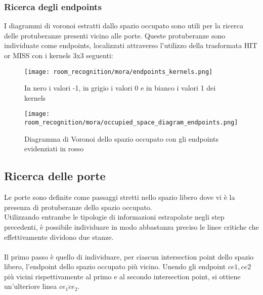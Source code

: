 \subsubsection{Ricerca degli endpoints}
I diagrammi di voronoi estratti dallo spazio occupato sono utili per la ricerca delle protuberanze presenti vicino alle porte. Queste protuberanze sono individuate come endpoints, localizzati attraverso l'utilizzo della trasformata HIT or MISS con i kernels 3x3 seguenti:
\begin{figure}[H]
  \centering
  \texttt{[image: room\_recognition/mora/endpoints\_kernels.png]}
  \caption{In nero i valori -1, in grigio i valori 0 e in bianco i valori 1 dei kernels}
\end{figure}
\begin{figure}[H]
  \centering
  \texttt{[image: room\_recognition/mora/occupied\_space\_diagram\_endpoints.png]}
  \caption{Diagramma di Voronoi dello spazio occupato con gli endpoints evidenziati in rosso}
\end{figure}
\subsection{Ricerca delle porte}
Le porte sono definite come passaggi stretti nello spazio libero dove vi è la presenza di protuberanze dello spazio occupato.\\
Utilizzando entrambe le tipologie di informazioni estrapolate negli step precedenti, è possibile individuare in modo abbastanza preciso le linee critiche che effettivamente dividono due stanze. \\\\
Il primo passo è quello di individuare, per ciascun intersection point dello spazio libero, l'endpoint dello spazio occupato più vicino. Unendo gli endpoint $ce1, ce2$ più vicini rispettivamente al primo e al secondo intersection point, si ottiene un'ulteriore linea $\overline{ce_1ce_2}$.\\

